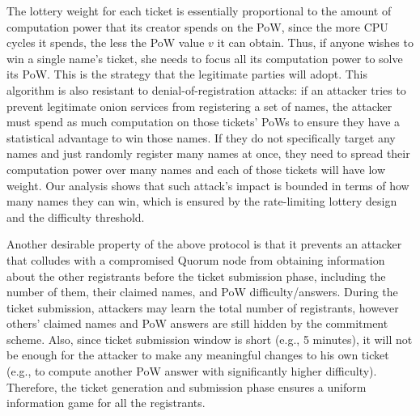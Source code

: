 \documentclass[USenglish,oneside,twocolumn]{article}
\begin{document}
The lottery weight for each ticket is essentially proportional to the amount of computation power that its creator spends on the PoW, since the more CPU cycles it spends, the less the PoW value $v$ it can obtain. Thus, if anyone wishes to win a single name's ticket, she needs to focus all its computation power to solve its PoW. This is the strategy that the legitimate parties will adopt. This algorithm is also resistant to denial-of-registration attacks: if an attacker tries to prevent legitimate onion services from registering a set of names, the attacker must spend as much computation on those tickets' PoWs to ensure they have a statistical advantage to win those names. If they do not specifically target any names and just randomly register many names at once, they need to spread their computation power over many names and each of those tickets will have low weight. Our analysis shows that such attack's impact is bounded in terms of how many names they can win, which is ensured by the rate-limiting lottery design and the difficulty threshold. 

Another desirable property of the above protocol is that it prevents an attacker that colludes with a compromised Quorum node from obtaining information about the other registrants before the ticket submission phase, including the number of them, their claimed names, and PoW difficulty/answers. During the ticket submission, attackers may learn the total number of registrants, however others' claimed names and PoW answers are still hidden by the commitment scheme. Also, since ticket submission window is short (e.g., 5 minutes), it will not be enough for the attacker to make any meaningful changes to his own ticket (e.g., to compute  another PoW answer with significantly higher difficulty). Therefore, the ticket generation and submission phase ensures a uniform information game for all the registrants. %

\end{document}
